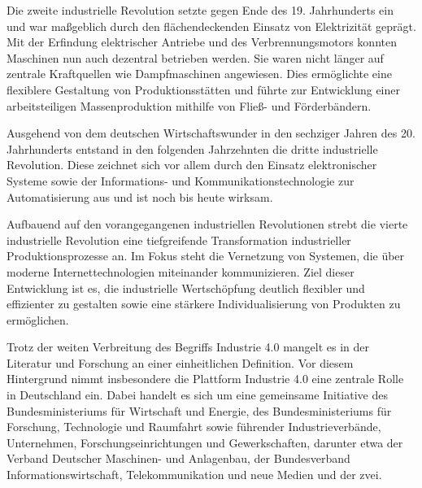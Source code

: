 Die zweite industrielle Revolution setzte gegen Ende des 19. Jahrhunderts ein und war maßgeblich durch den flächendeckenden Einsatz von Elektrizität geprägt. 
Mit der Erfindung elektrischer Antriebe und des Verbrennungsmotors konnten Maschinen nun auch dezentral betrieben werden. Sie waren nicht länger auf zentrale Kraftquellen wie Dampfmaschinen angewiesen. 
Dies ermöglichte eine flexiblere Gestaltung von Produktionsstätten und führte zur Entwicklung einer arbeitsteiligen Massenproduktion mithilfe von Fließ- und Förderbändern.

Ausgehend von dem deutschen Wirtschaftswunder in den sechziger Jahren des 20. Jahrhunderts entstand in den folgenden Jahrzehnten die dritte industrielle Revolution.
Diese zeichnet sich vor allem durch den Einsatz elektronischer Systeme sowie der Informations- und Kommunikationstechnologie zur Automatisierung aus und ist noch bis heute wirksam.

Aufbauend auf den vorangegangenen industriellen Revolutionen strebt die vierte industrielle Revolution eine tiefgreifende Transformation industrieller Produktionsprozesse an. 
Im Fokus steht die Vernetzung von Systemen, die über moderne Internettechnologien miteinander kommunizieren.
Ziel dieser Entwicklung ist es, die industrielle Wertschöpfung deutlich flexibler und effizienter zu gestalten sowie eine stärkere Individualisierung von Produkten zu ermöglichen. 
\cite{Industrie4.0ProduktionAutomatisierung}\cite{EinführungundUmsetzungI4.0}

Trotz der weiten Verbreitung des Begriffs Industrie 4.0 mangelt es in der Literatur und Forschung an einer einheitlichen Definition.
Vor diesem Hintergrund nimmt insbesondere die Plattform Industrie 4.0 \cite{plattform_i40} eine zentrale Rolle in Deutschland ein. 
Dabei handelt es sich um eine gemeinsame Initiative des Bundesministeriums für Wirtschaft und Energie, des Bundesministeriums für Forschung, Technologie und Raumfahrt sowie führender Industrieverbände, Unternehmen, Forschungseinrichtungen und Gewerkschaften, darunter etwa der Verband Deutscher Maschinen- und Anlagenbau, der Bundesverband Informationswirtschaft, Telekommunikation und neue Medien und der \ac{zvei}.

